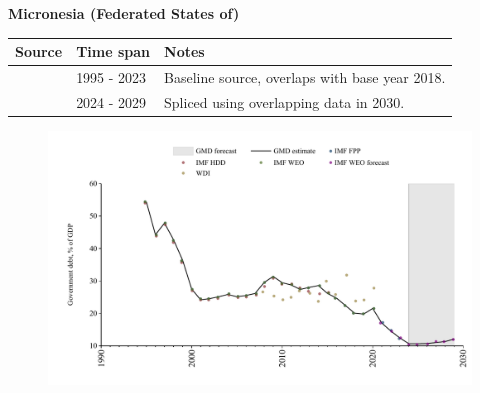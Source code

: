 \documentclass[12pt,a4paper,landscape]{article}
\begin{document}
\begin{adjustbox}{max totalsize={\paperwidth}{\paperheight},center}
\begin{minipage}[t][\textheight][t]{\textwidth}
\vspace*{0.5cm}
{}
\begin{center}
{\Large\bfseries Micronesia (Federated States of)}
\end{center}
\vspace{0.5cm}
\begin{table}[H]
\centering
\small
\begin{tabular}{|l|l|l|}
\hline
\textbf{Source} & \textbf{Time span} & \textbf{Notes} \\
\hline
\rowcolor{white}\cite{IMF_FPP}& 1995 - 2023 &Baseline source, overlaps with base year 2018.\\
\rowcolor{lightgray}\cite{IMF_WEO_forecast}& 2024 - 2029 &Spliced using overlapping data in 2030.\\
\hline
\end{tabular}
\end{table}
\begin{figure}[H]
\centering
\includegraphics[width=\textwidth,height=0.6\textheight,keepaspectratio]{graphs/FSM_govdebt_GDP.pdf}
\end{figure}
\end{minipage}
\end{adjustbox}
\end{document}
